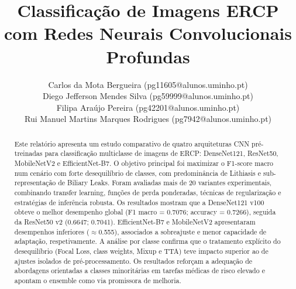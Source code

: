 \documentclass[runningheads]{llncs}
\begin{document}
%
\title{Classificação de Imagens ERCP com Redes Neurais Convolucionais Profundas}
%
%
\author{
Carlos da Mota Bergueira (pg11605@alunos.uminho.pt) \\
Diego Jefferson Mendes Silva (pg59999@alunos.uminho.pt) \\
Filipa Araújo Pereira (pg42201@alunos.uminho.pt) \\
Rui Manuel Martins Marques Rodrigues (pg7942@alunos.uminho.pt)
}
%
%
%
\maketitle              %
%
\begin{abstract}
Este relatório apresenta um estudo comparativo de quatro arquiteturas CNN
pré-treinadas para classificação multiclasse de imagens de ERCP:
DenseNet121, ResNet50, MobileNetV2 e EfficientNet-B7. O objetivo principal
foi maximizar o F1-score macro num cenário com forte desequilíbrio de
classes, com predominância de Lithiasis e sub-representação de Biliary Leaks.
Foram avaliadas mais de 20 variantes experimentais, combinando transfer
learning, funções de perda ponderadas, técnicas de regularização e estratégias
de inferência robusta. Os resultados mostram que a DenseNet121 v100 obteve o
melhor desempenho global (F1 macro = 0.7076; accuracy = 0.7266), seguida da
ResNet50 v2 (0.6647; 0.7041). EfficientNet-B7 e MobileNetV2 apresentaram
desempenhos inferiores (\(\approx\)0.555), associados a sobreajuste e menor
capacidade de adaptação, respetivamente. A análise por classe confirma que o
tratamento explícito do desequilíbrio (Focal Loss, class weights, Mixup e TTA)
teve impacto superior ao de ajustes isolados de pré-processamento. Os
resultados reforçam a adequação de abordagens orientadas a classes minoritárias
em tarefas médicas de risco elevado e apontam o ensemble como via promissora
de melhoria.

\end{abstract}
%
\end{document}
